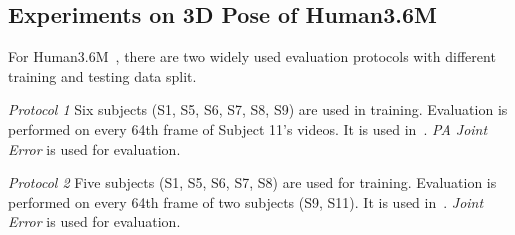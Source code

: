 \documentclass[10pt,twocolumn,letterpaper]{article}
\newcommand{\cmark}{\ding{51}}%
\newcommand{\xmark}{\ding{55}}%
\begin{document}
\subsection{Experiments on 3D Pose of Human3.6M}
For Human3.6M~\cite{ionescu2014human3}, there are two widely used evaluation protocols with different training and testing data split.

\emph{Protocol 1} Six subjects (S1, S5, S6, S7, S8, S9) are used in training. Evaluation is performed on every 64th frame of Subject 11's videos. It is used in~\cite{yasin2016dual,rogez2016mocap,chen20163d,moreno20163d,zhou2017monocap}. \emph{PA Joint Error} is used for evaluation.


\emph{Protocol 2} Five subjects (S1, S5, S6, S7, S8) are used for training. Evaluation is performed on every 64th frame of two subjects (S9, S11). It is used in~\cite{zhou2016sparseness,tekin2016direct,zhou2016deep,chen20163d,tome2017lifting,moreno20163d,zhou2017monocap,jahangiri2017generating,mehta2016monocular,pavlakos2016coarse}. \emph{Joint Error} is used for evaluation.

\begin{comment}
\begin{table}
\begin{center}
\begin{tabular}{lcccccccc}
\hline\noalign{\smallskip}
 & Setting1  & Setting2 & Setting3\\
\noalign{\smallskip}
\hline
\noalign{\smallskip}
Protocol 		 &1    & 2	&2	\\
Use MPII Data &\cmark    & \cmark & \xmark 	 \\
\hline
\end{tabular}
\caption{Three experiment settings on Human3.6M dataset according to different protocols and training data.}
\label{table:hm36setting}
\end{center}
\end{table}
\end{comment}
\end{document}
